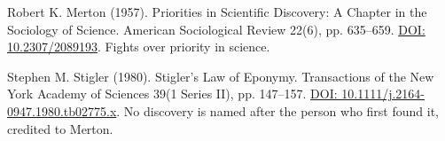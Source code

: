 \noindent Robert K. Merton (1957). Priorities in Scientific Discovery: A Chapter in the Sociology of Science. American Sociological Review 22(6), pp. 635--659. \href{https://doi.org/10.2307/2089193}{DOI: 10.2307/2089193}. Fights over priority in science.
\par\medskip

\noindent Stephen M. Stigler (1980). Stigler's Law of Eponymy. Transactions of the New York Academy of Sciences 39(1 Series II), pp. 147--157. \href{https://doi.org/10.1111/j.2164-0947.1980.tb02775.x}{DOI: 10.1111/j.2164-0947.1980.tb02775.x}. No discovery is named after the person who first found it, credited to Merton.
\par\medskip

